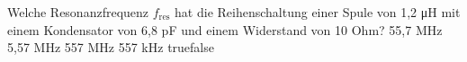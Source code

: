     {Welche Resonanzfrequenz $f_{\textrm{res}}$ hat die Reihenschaltung einer Spule von 1,2 \si{\micro\henry} mit einem Kondensator von 6,8 pF und einem Widerstand von 10 Ohm?}
    {55,7 MHz}
    {5,57 MHz}
    {557 MHz}
    {557 kHz}
    {true}{false}